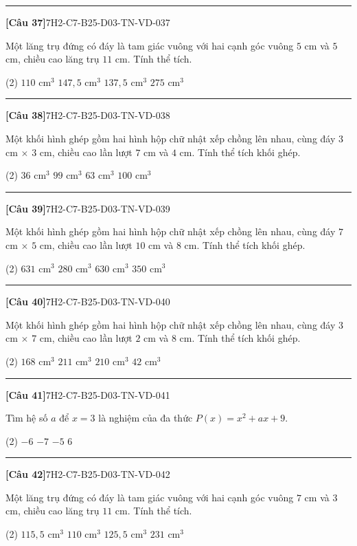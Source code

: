 \documentclass[12pt,a4paper]{article}
\newif\ifloigiai
\newenvironment{cauhoi}[2]{%
  \par\medskip\noindent\rule{\textwidth}{0.4pt}\par\nopagebreak
  \noindent\textbf{[#1]}\hfill{\scriptsize\ttfamily #2}\par\nopagebreak\smallskip}{\par}
\newcommand{\dapan}[1]{\ifloigiai\par\smallskip\noindent\textit{Đáp án:} \textbf{#1}\par\fi}
\begin{document}
\begin{cauhoi}{Câu 37}{7H2-C7-B25-D03-TN-VD-037}
Một lăng trụ đứng có đáy là tam giác vuông với hai cạnh góc vuông $5$ cm và $5$ cm, chiều cao lăng trụ $11$ cm. Tính thể tích.
\begin{tasks}(2)
\task $110\text{ cm}^3$
\task $147,5\text{ cm}^3$
\task $137,5\text{ cm}^3$
\task $275\text{ cm}^3$
\end{tasks}
\dapan{C}
\end{cauhoi}
\begin{cauhoi}{Câu 38}{7H2-C7-B25-D03-TN-VD-038}
Một khối hình ghép gồm hai hình hộp chữ nhật xếp chồng lên nhau, cùng đáy $3$ cm $\times$ $3$ cm, chiều cao lần lượt $7$ cm và $4$ cm. Tính thể tích khối ghép.
\begin{tasks}(2)
\task $36\text{ cm}^3$
\task $99\text{ cm}^3$
\task $63\text{ cm}^3$
\task $100\text{ cm}^3$
\end{tasks}
\dapan{B}
\end{cauhoi}
\begin{cauhoi}{Câu 39}{7H2-C7-B25-D03-TN-VD-039}
Một khối hình ghép gồm hai hình hộp chữ nhật xếp chồng lên nhau, cùng đáy $7$ cm $\times$ $5$ cm, chiều cao lần lượt $10$ cm và $8$ cm. Tính thể tích khối ghép.
\begin{tasks}(2)
\task $631\text{ cm}^3$
\task $280\text{ cm}^3$
\task $630\text{ cm}^3$
\task $350\text{ cm}^3$
\end{tasks}
\dapan{C}
\end{cauhoi}
\begin{cauhoi}{Câu 40}{7H2-C7-B25-D03-TN-VD-040}
Một khối hình ghép gồm hai hình hộp chữ nhật xếp chồng lên nhau, cùng đáy $3$ cm $\times$ $7$ cm, chiều cao lần lượt $2$ cm và $8$ cm. Tính thể tích khối ghép.
\begin{tasks}(2)
\task $168\text{ cm}^3$
\task $211\text{ cm}^3$
\task $210\text{ cm}^3$
\task $42\text{ cm}^3$
\end{tasks}
\dapan{C}
\end{cauhoi}
\begin{cauhoi}{Câu 41}{7H2-C7-B25-D03-TN-VD-041}
Tìm hệ số $a$ để $x=3$ là nghiệm của đa thức $P(x)=x^{2}+ax+9$.
\begin{tasks}(2)
\task $-6$
\task $-7$
\task $-5$
\task $6$
\end{tasks}
\dapan{A}
\end{cauhoi}
\begin{cauhoi}{Câu 42}{7H2-C7-B25-D03-TN-VD-042}
Một lăng trụ đứng có đáy là tam giác vuông với hai cạnh góc vuông $7$ cm và $3$ cm, chiều cao lăng trụ $11$ cm. Tính thể tích.
\begin{tasks}(2)
\task $115,5\text{ cm}^3$
\task $110\text{ cm}^3$
\task $125,5\text{ cm}^3$
\task $231\text{ cm}^3$
\end{tasks}
\dapan{A}
\end{cauhoi}
\end{document}
